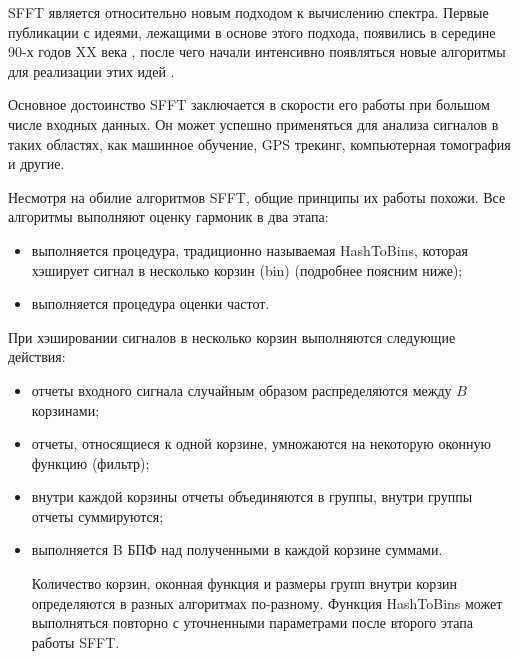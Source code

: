 SFFT является относительно новым подходом к вычислению спектра.
Первые публикации с идеями, лежащими в основе этого подхода, появились в
середине 90-х годов XX века \cite{kushilevitz1993learning}, после чего начали интенсивно появляться
новые алгоритмы для реализации этих идей \cite{hassanieh2012faster, hassanieh2012nearly, pawar2013computing, schumacher2014high, hassanieh2012simple}.

Основное достоинство SFFT заключается в скорости его работы при большом числе входных данных. Он может успешно применяться для анализа сигналов в таких областях, как машинное обучение, GPS трекинг, компьютерная томография и другие.


Несмотря на обилие алгоритмов SFFT, общие принципы их работы похожи. Все алгоритмы выполняют оценку гармоник в два этапа:

\begin{itemize}
\item выполняется процедура, традиционно называемая HashToBins, которая хэширует сигнал в несколько корзин (bin) (подробнее поясним ниже);
\item выполняется процедура оценки частот.
\end{itemize}

При хэшировании сигналов в несколько корзин выполняются следующие действия:
\begin{itemize}
\item отчеты входного сигнала случайным образом распределяются между $B$ корзинами;
\item отчеты, относящиеся к одной корзине, умножаются на некоторую
оконную функцию (фильтр);
\item внутри каждой корзины отчеты объединяются в группы, внутри группы отчеты суммируются;
\item выполняется B БПФ над полученными в каждой корзине суммами.

Количество корзин, оконная функция и размеры групп внутри корзин определяются в разных алгоритмах по-разному. Функция HashToBins может выполняться повторно с уточненными параметрами после второго этапа работы SFFT.
\end{itemize}


